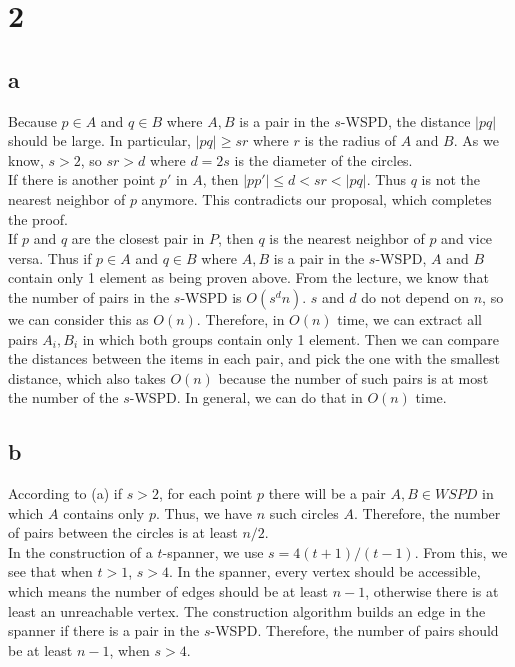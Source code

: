 \section*{2}
\subsection*{a}

Because $p \in A$ and $q \in B$ where ${A,B}$ is a pair in the $s$-WSPD, the distance $|pq|$ should be large. In particular, $|pq| \geq sr$ where $r$ is the radius of $A$ and $B$. As we know, $s > 2$, so $sr > d$ where $d = 2s$ is the diameter of the circles. \\

If there is another point $p'$ in $A$, then $|pp'| \leq d < sr < |pq|$. Thus $q$ is not the nearest neighbor of $p$ anymore. This contradicts our proposal, which completes the proof.\\

If $p$ and $q$ are the closest pair in $P$, then $q$ is the nearest neighbor of $p$ and vice versa. Thus if $p \in A$ and $q \in B$ where ${A,B}$ is a pair in the $s$-WSPD, $A$ and $B$ contain only 1 element as being proven above. From the lecture, we know that the number of pairs in the $s$-WSPD is $O(s^d n)$. $s$ and $d$ do not depend on $n$, so we can consider this as $O(n)$. Therefore, in $O(n)$ time, we can extract all pairs ${A_i, B_i}$ in which both groups contain only 1 element. Then we can compare the distances between the items in each pair, and pick the one with the smallest distance, which also takes $O(n)$ because the number of such pairs is at most the number of the $s$-WSPD. In general, we can do that in $O(n)$ time.\\

\subsection*{b}
According to (a) if $s > 2$, for each point $p$ there will be a pair ${A,B} \in WSPD$ in which $A$ contains only $p$.
Thus, we have $n$ such circles $A$. Therefore, the number of pairs between the circles is at least $n/2$. \\

In the construction of a $t$-spanner, we use $s = 4(t + 1) / (t - 1)$. From this, we see that when $t > 1$, $s > 4$.
In the spanner, every vertex should be accessible, which means the number of edges
should be at least $n - 1$, otherwise there is at least an unreachable vertex.
The construction algorithm builds an edge in the spanner if there is a pair in
the $s$-WSPD. Therefore, the number of pairs should be at least $n - 1$, when $s > 4$. \\


